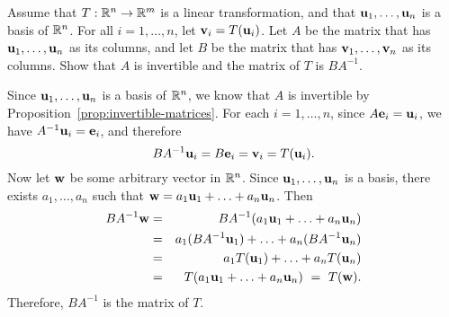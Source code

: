 \begin{enumialphparenastyle}
\begin{ex}\label{ex:linear-transformation-inconvenient}
  Assume that $T:\mathbb{R}^{n}\rightarrow \mathbb{R}^{m}$ is a linear transformation,
  and that $\mbox{\bf u}_1,\ldots,\mbox{\bf u}_n$ is a basis of $\mathbb{R}^n$. For
  all $i=1,\ldots,n$, let $\mbox{\bf v}_i = T(\mbox{\bf u}_i)$. Let $A$ be the
  matrix that has $\mbox{\bf u}_1,\ldots,\mbox{\bf u}_n$ as its columns, and
  let $B$ be the matrix that has $\mbox{\bf v}_1,\ldots,\mbox{\bf v}_n$ as its
  columns. Show that $A$ is invertible and the matrix of $T$ is
  $BA^{-1}$.
  \begin{sol}
    Since $\mbox{\bf u}_1,\ldots,\mbox{\bf u}_n$ is a basis of $\mathbb{R}^n$, we know
    that $A$ is invertible by  Proposition~\ref{prop:invertible-matrices}.
    For each $i=1,\ldots,n$, since $A\mbox{\bf e}_i = \mbox{\bf u}_i$, we have
    $A^{-1}\mbox{\bf u}_i=\mbox{\bf e}_i$, and therefore
    \begin{equation*}
      BA^{-1}\mbox{\bf u}_i = B\mbox{\bf e}_i = \mbox{\bf v}_i = T(\mbox{\bf u}_i).
    \end{equation*}
    Now let $\mbox{\bf w}$ be some arbitrary vector in $\mathbb{R}^n$. Since
    $\mbox{\bf u}_1,\ldots,\mbox{\bf u}_n$ is a basis, there exists
    $a_1,\ldots,a_n$ such that $\mbox{\bf w} =
    a_1\mbox{\bf u}_1+\ldots+a_n\mbox{\bf u}_n$. Then
    \begin{eqnarray*}
      BA^{-1}\mbox{\bf w}
      &=& BA^{-1}(a_1\mbox{\bf u}_1+\ldots+a_n\mbox{\bf u}_n) \\
      &=& a_1(BA^{-1}\mbox{\bf u}_1) + \ldots + a_n(BA^{-1}\mbox{\bf u}_n) \\
      &=& a_1T(\mbox{\bf u}_1) + \ldots + a_nT(\mbox{\bf u}_n) \\
      &=& T(a_1\mbox{\bf u}_1+\ldots+a_n\mbox{\bf u}_n) ~=~ T(\mbox{\bf w}).
    \end{eqnarray*}
    Therefore, $BA^{-1}$ is the matrix of $T$.
  \end{sol}
\end{ex}


\end{enumialphparenastyle}
